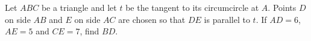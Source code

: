 Let $ABC$ be a triangle and let $t$ be the tangent to its circumcircle at $A$. Points $D$ on side $AB$ and $E$ on side $AC$ are chosen so that $DE$ is parallel to $t$. If $AD=6$, $AE=5$ and $CE=7$, find $BD$.
